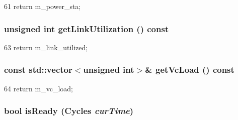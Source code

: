 \begin{DoxyCode}
61 { return m_power_sta; }
\end{DoxyCode}
\hypertarget{classNetworkLink__d_a268a57ca669794bfa1abea88af8fe2f9}{
\subsubsection[{getLinkUtilization}]{\setlength{\rightskip}{0pt plus 5cm}unsigned int getLinkUtilization () const}}
\label{classNetworkLink__d_a268a57ca669794bfa1abea88af8fe2f9}



\begin{DoxyCode}
63 { return m_link_utilized; }
\end{DoxyCode}
\hypertarget{classNetworkLink__d_ac460400c34855ef93de2d591ba56f803}{
\subsubsection[{getVcLoad}]{\setlength{\rightskip}{0pt plus 5cm}const {\bf std::vector}$<$unsigned int$>$\& getVcLoad () const}}
\label{classNetworkLink__d_ac460400c34855ef93de2d591ba56f803}



\begin{DoxyCode}
64 { return m_vc_load; }
\end{DoxyCode}
\hypertarget{classNetworkLink__d_ae19b07af91a49435139ba13f5665b239}{
\subsubsection[{isReady}]{\setlength{\rightskip}{0pt plus 5cm}bool isReady ({\bf Cycles} {\em curTime})}}
\label{classNetworkLink__d_ae19b07af91a49435139ba13f5665b239}



